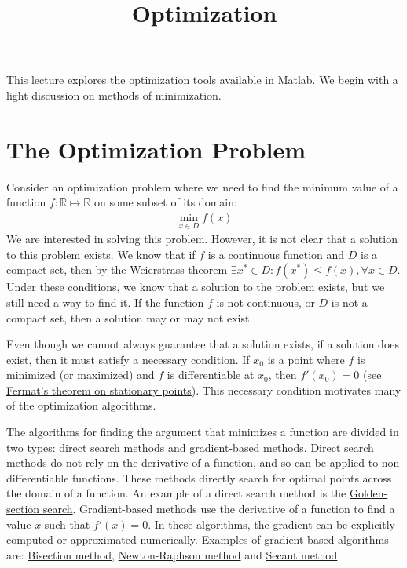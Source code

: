 \documentclass[12pt, a4paper]{article}
\date{}
\title{Optimization}
\begin{document}
\maketitle
This lecture explores the optimization tools available in Matlab.
We begin with a light discussion on methods of minimization.
\section{The Optimization Problem}
\label{sec:org669c6c8}
Consider an optimization problem where we need to find the minimum value of a function \(f:\mathbb{R}\mapsto\mathbb{R}\) on some subset of its domain:
\begin{align*}
\min_{x\in D}{f(x)}
\end{align*}
We are interested in solving this problem.
However, it is not clear that a solution to this problem exists.
We know that if \(f\) is a \href{https://en.wikipedia.org/wiki/Continuous\_function}{continuous function} and \(D\) is a \href{https://en.wikipedia.org/wiki/Compact\_space}{compact set}, then by the \href{https://en.wikipedia.org/wiki/Extreme\_value\_theorem}{Weierstrass theorem} \(\exists x^*\in D:f(x^*)\leq f(x),\forall x\in D\).
Under these conditions, we know that a solution to the problem exists, but we still need a way to find it.
If the function \(f\) is not continuous, or \(D\) is not a compact set, then a solution may or may not exist.

Even though we cannot always guarantee that a solution exists, if a solution does exist, then it must satisfy a necessary condition.
If \(x_0\) is a point where \(f\) is minimized (or maximized) and \(f\) is differentiable at \(x_0\), then \(f'(x_0)=0\) (see \href{https://en.wikipedia.org/wiki/Fermat\%27s\_theorem\_(stationary\_points)}{Fermat's theorem on stationary points}).
This necessary condition motivates many of the optimization algorithms.

The algorithms for finding the argument that minimizes a function are divided in two types: direct search methods and gradient-based methods.
Direct search methods do not rely on the derivative of a function, and so can be applied to non differentiable functions.
These methods directly search for optimal points across the domain of a function.
An example of a direct search method is the \href{https://en.wikipedia.org/wiki/Golden-section\_search}{Golden-section search}.
Gradient-based methods use the derivative of a function to find a value \(x\) such that \(f'(x)=0\).
In these algorithms, the gradient can be explicitly computed or approximated numerically.
Examples of gradient-based algorithms are: \href{https://en.wikipedia.org/wiki/Bisection\_method}{Bisection method}, \href{https://en.wikipedia.org/wiki/Newton's\_method}{Newton-Raphson method} and \href{https://en.wikipedia.org/wiki/Secant\_method}{Secant method}.
\end{document}
